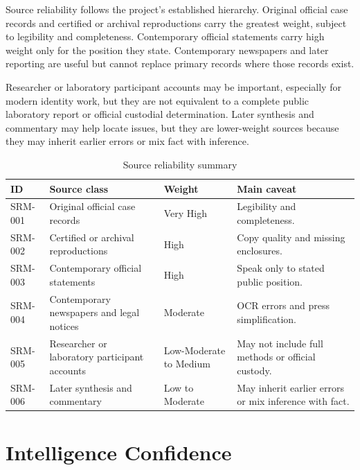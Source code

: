 Source reliability follows the project's established hierarchy. Original official case records and certified or archival reproductions carry the greatest weight, subject to legibility and completeness. Contemporary official statements carry high weight only for the position they state. Contemporary newspapers and later reporting are useful but cannot replace primary records where those records exist.

Researcher or laboratory participant accounts may be important, especially for modern identity work, but they are not equivalent to a complete public laboratory report or official custodial determination. Later synthesis and commentary may help locate issues, but they are lower-weight sources because they may inherit earlier errors or mix fact with inference.

\begin{table}[htbp]
\centering
\caption{Source reliability summary}
\label{tab:chapter10-source-reliability}
\scriptsize
\setlength{\tabcolsep}{2pt}
\renewcommand{\arraystretch}{1.12}
\begin{tabularx}{\textwidth}{>{\raggedright\arraybackslash}p{}>{\raggedright\arraybackslash}p{}>{\raggedright\arraybackslash}p{}>{\raggedright\arraybackslash}X}
\toprule
ID & Source class & Weight & Main caveat \\
\midrule
SRM-001 & Original official case records & Very High & Legibility and completeness. \\
SRM-002 & Certified or archival reproductions & High & Copy quality and missing enclosures. \\
SRM-003 & Contemporary official statements & High & Speak only to stated public position. \\
SRM-004 & Contemporary newspapers and legal notices & Moderate & OCR errors and press simplification. \\
SRM-005 & Researcher or laboratory participant accounts & Low-Moderate to Medium & May not include full methods or official custody. \\
SRM-006 & Later synthesis and commentary & Low to Moderate & May inherit earlier errors or mix inference with fact. \\
\bottomrule
\end{tabularx}
\end{table}

\section{Intelligence Confidence}

